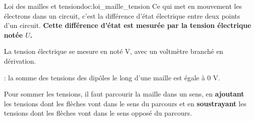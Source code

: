 \begin{doc}{Loi des mailles et tension}{doc:loi_maille_tension}
  Ce qui met en mouvement les électrons dans un circuit, c'est la différence d'état électrique entre deux points d'un circuit.
  \textbf{Cette différence d'état est mesurée par la tension électrique notée $U$.}
  \begin{importants}
    La tension électrique se mesure en  noté V, avec un voltmètre branché en dérivation.
  \end{importants}
  \begin{importants}
     : la somme des tensions des dipôles le long d'une maille est égale à 0 V.
  \end{importants}
  \chevron Pour sommer les tensions, il faut parcourir la maille dans un sens, en \textbf{ajoutant} les tensions dont les flèches vont dans le sens du parcours et en \textbf{soustrayant} les tensions dont les flèches vont dans le sens opposé du parcours.
\end{doc}

